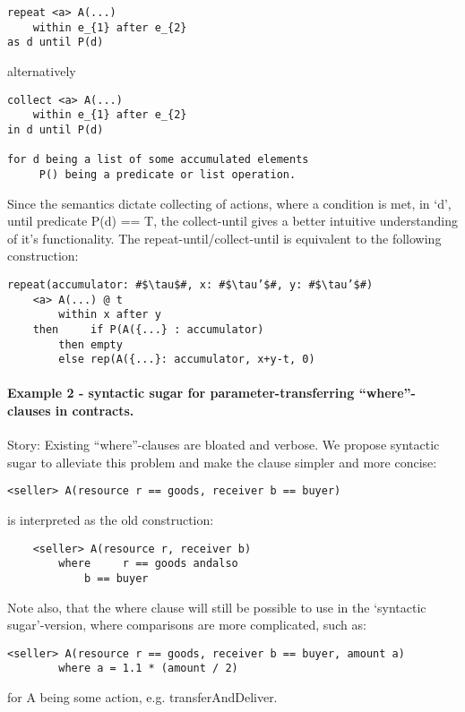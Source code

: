 \documentclass[10pt,a4paper,final,oneside,openany,article]{memoir}
\begin{document}
\begin{lstlisting}
repeat <a> A(...)
    within e_{1} after e_{2}
as d until P(d)
\end{lstlisting}
alternatively
\begin{lstlisting}
collect <a> A(...)
    within e_{1} after e_{2}
in d until P(d)

for d being a list of some accumulated elements
     P() being a predicate or list operation.
\end{lstlisting}     
Since the semantics dictate collecting of actions, where a condition is met, in
‘d’, until predicate P(d) == T, the collect-until gives a better intuitive
understanding of it’s functionality.
The repeat-until/collect-until is equivalent to the following construction:
\begin{lstlisting}[escapechar=\#]
repeat(accumulator: #$\tau$#, x: #$\tau’$#, y: #$\tau’$#)
    <a> A(...) @ t
        within x after y
    then     if P(A({...} : accumulator)
        then empty
        else rep(A({...}: accumulator, x+y-t, 0)
\end{lstlisting}

\paragraph{Example 2 - syntactic sugar for parameter-transferring “where”-clauses in contracts.}
Story: Existing “where”-clauses are bloated and verbose. We propose syntactic sugar to alleviate this problem and make the clause simpler and more concise:

\begin{lstlisting}
<seller> A(resource r == goods, receiver b == buyer)
\end{lstlisting}
is interpreted as the old construction:
\begin{lstlisting}
    <seller> A(resource r, receiver b)
        where     r == goods andalso
            b == buyer
\end{lstlisting}

Note also, that the where clause will still be possible to use in the ‘syntactic
sugar’-version, where comparisons are more complicated, such as:

\begin{lstlisting}
<seller> A(resource r == goods, receiver b == buyer, amount a)
        where a = 1.1 * (amount / 2)
\end{lstlisting}

for A being some action, e.g. transferAndDeliver.
\end{document}
